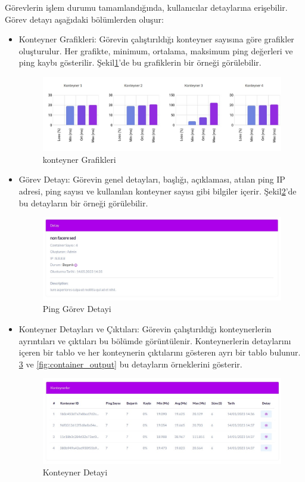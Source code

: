 Görevlerin işlem durumu tamamlandığında, kullanıcılar detaylarına erişebilir. Görev detayı aşağıdaki bölümlerden oluşur:
\begin{itemize}
  \item Konteyner Grafikleri: Görevin çalıştırıldığı konteyner sayısına göre grafikler oluşturulur. Her grafikte, minimum, ortalama, maksimum ping değerleri ve ping kaybı gösterilir. Şekil\ref{fig:container_graphic}'de bu grafiklerin bir örneği görülebilir.
  \begin{figure}[ht]
    \centering
    \includegraphics[width=0.6\linewidth]{images/ping_graphic.jpeg}
    \caption{konteyner Grafikleri}
    \label{fig:container_graphic}
  \end{figure}
  
  \item Görev Detayı: Görevin genel detayları, başlığı, açıklaması, atılan ping IP adresi, ping sayısı ve kullanılan konteyner sayısı gibi bilgiler içerir. Şekil\ref{fig:ping_detail}'de bu detayların bir örneği görülebilir.
  \begin{figure}[ht]
    \centering
    \includegraphics[width=0.6\linewidth]{images/ping_detail.jpeg}
    \caption{Ping Görev Detayi}
    \label{fig:ping_detail}
  \end{figure}
  
  \item Konteyner Detayları ve Çıktıları: Görevin çalıştırıldığı konteynerlerin ayrıntıları ve çıktıları bu bölümde görüntülenir. Konteynerlerin detaylarını içeren bir tablo ve her konteynerin çıktılarını gösteren ayrı bir tablo bulunur. \ref{fig:container_detail} ve \ref{fig:container_output} bu detayların örneklerini gösterir.
  \begin{figure}[ht]
    \centering
    \includegraphics[width=0.6\linewidth]{images/container_detail.jpeg}
    \caption{Konteyner Detayi}
    \label{fig:container_detail}
  \end{figure}


\end{itemize}
